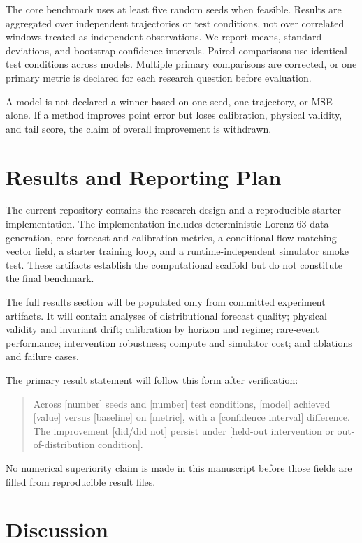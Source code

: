 \documentclass[11pt]{article}
\begin{document}
The core benchmark uses at least five random seeds when feasible. Results are aggregated over independent trajectories or test conditions, not over correlated windows treated as independent observations. We report means, standard deviations, and bootstrap confidence intervals. Paired comparisons use identical test conditions across models. Multiple primary comparisons are corrected, or one primary metric is declared for each research question before evaluation.

A model is not declared a winner based on one seed, one trajectory, or MSE alone. If a method improves point error but loses calibration, physical validity, and tail score, the claim of overall improvement is withdrawn.

\section{Results and Reporting Plan}

The current repository contains the research design and a reproducible starter implementation. The implementation includes deterministic Lorenz-63 data generation, core forecast and calibration metrics, a conditional flow-matching vector field, a starter training loop, and a runtime-independent simulator smoke test. These artifacts establish the computational scaffold but do not constitute the final benchmark.

The full results section will be populated only from committed experiment artifacts. It will contain analyses of distributional forecast quality; physical validity and invariant drift; calibration by horizon and regime; rare-event performance; intervention robustness; compute and simulator cost; and ablations and failure cases.

The primary result statement will follow this form after verification:
\begin{quote}
\small
Across [number] seeds and [number] test conditions, [model] achieved [value] versus [baseline] on [metric], with a [confidence interval] difference. The improvement [did/did not] persist under [held-out intervention or out-of-distribution condition].
\end{quote}

No numerical superiority claim is made in this manuscript before those fields are filled from reproducible result files.

\section{Discussion}
\end{document}
